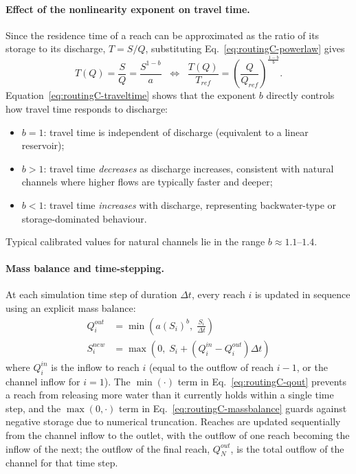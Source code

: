 \documentclass[a4paper, 12pt]{report}
\begin{document}
\paragraph{Effect of the nonlinearity exponent on travel time.}
Since the residence time of a reach can be approximated as the ratio of its storage to its
discharge, $T = S/Q$, substituting Eq.~\eqref{eq:routingC-powerlaw} gives
\begin{equation}
	T(Q) = \frac{S}{Q} = \frac{S^{1-b}}{a}
	\;\;\Longleftrightarrow\;\;
	\frac{T(Q)}{T_{ref}} = \left(\frac{Q}{Q_{ref}}\right)^{\tfrac{1-b}{b}}.
	\label{eq:routingC-traveltime}
\end{equation}
Equation~\eqref{eq:routingC-traveltime} shows that the exponent $b$ directly controls how travel
time responds to discharge:
\begin{itemize}
	\item $b = 1$: travel time is independent of discharge (equivalent to a linear reservoir);
	\item $b > 1$: travel time \emph{decreases} as discharge increases, consistent with natural
	channels where higher flows are typically faster and deeper;
	\item $b < 1$: travel time \emph{increases} with discharge, representing backwater-type or
	storage-dominated behaviour.
\end{itemize}
Typical calibrated values for natural channels lie in the range $b \approx 1.1$--$1.4$.

\paragraph{Mass balance and time-stepping.}
At each simulation time step of duration $\Delta t$, every reach $i$ is updated in sequence using
an explicit mass balance:
\begin{align}
	Q_i^{out} &= \min\!\left( a \left(S_i\right)^{b},\; \frac{S_i}{\Delta t} \right)
	\label{eq:routingC-qout} \\
	S_i^{new} &= \max\!\left( 0,\; S_i + \left(Q_i^{in} - Q_i^{out}\right) \Delta t \right)
	\label{eq:routingC-massbalance}
\end{align}
where $Q_i^{in}$ is the inflow to reach $i$ (equal to the outflow of reach $i-1$, or the channel
inflow for $i=1$). The $\min(\cdot)$ term in Eq.~\eqref{eq:routingC-qout} prevents a reach from
releasing more water than it currently holds within a single time step, and the $\max(0,\cdot)$
term in Eq.~\eqref{eq:routingC-massbalance} guards against negative storage due to numerical
truncation. Reaches are updated sequentially from the channel inflow to the outlet, with the
outflow of one reach becoming the inflow of the next; the outflow of the final reach, $Q_N^{out}$,
is the total outflow of the channel for that time step.
\end{document}
